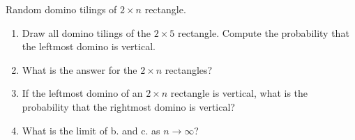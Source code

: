 \documentclass[11pt,fleqn]{book} %
\begin{document}
\begin{problem}
    Random domino tilings of  $2\times n$ rectangle.
        \begin{center}
        \end{center}
   \begin{enumerate}[label=\alph*.]
    \item Draw all domino tilings of the $2\times 5$ rectangle. Compute the probability that the leftmost domino is vertical.
    \item What is the answer for the $2\times n$ rectangles?
    \item If the leftmost domino of an $2\times n$ rectangle is vertical, what is the probability that the rightmost domino is vertical? 
    \item What is the limit of b. and c. as $n\to\infty$?
   \end{enumerate}
\end{problem}
\end{document}
